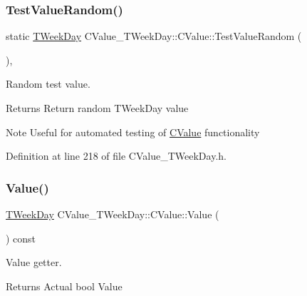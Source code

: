 \subsubsection{\texorpdfstring{Test\+Value\+Random()}{TestValueRandom()}}
{\footnotesize\ttfamily static \hyperlink{namespace_c_value___t_week_day_a6412f204509f223b789fb5f1a61a6124}{T\+Week\+Day} C\+Value\+\_\+\+T\+Week\+Day\+::\+C\+Value\+::\+Test\+Value\+Random (\begin{DoxyParamCaption}{ }\end{DoxyParamCaption})\hspace{0.3cm}{\ttfamily [inline]}, {\ttfamily [static]}}



Random test value. 

\begin{DoxyReturn}{Returns}
Return random T\+Week\+Day value 
\end{DoxyReturn}
\begin{DoxyNote}{Note}
Useful for automated testing of \hyperlink{class_c_value___t_week_day_1_1_c_value}{C\+Value} functionality 
\end{DoxyNote}


Definition at line 218 of file C\+Value\+\_\+\+T\+Week\+Day.\+h.

\mbox{\label{class_c_value___t_week_day_1_1_c_value_ae77674d9367e894d5627330076f585c4}} 
\subsubsection{\texorpdfstring{Value()}{Value()}}
{\footnotesize\ttfamily \hyperlink{namespace_c_value___t_week_day_a6412f204509f223b789fb5f1a61a6124}{T\+Week\+Day} C\+Value\+\_\+\+T\+Week\+Day\+::\+C\+Value\+::\+Value (\begin{DoxyParamCaption}{ }\end{DoxyParamCaption}) const\hspace{0.3cm}{\ttfamily [inline]}}



Value getter. 

\begin{DoxyReturn}{Returns}
Actual {\ttfamily bool} {\ttfamily Value} 
\end{DoxyReturn}


